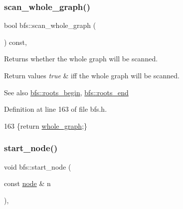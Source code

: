 \subsubsection{\texorpdfstring{scan\+\_\+whole\+\_\+graph()}{scan\_whole\_graph()}\hspace{0.1cm}{\footnotesize\ttfamily [2/2]}}
{\footnotesize\ttfamily bool bfs\+::scan\+\_\+whole\+\_\+graph (\begin{DoxyParamCaption}{ }\end{DoxyParamCaption}) const\hspace{0.3cm}{\ttfamily [inline]}, {\ttfamily [inherited]}}



Returns whether the whole graph will be scanned. 


\begin{DoxyRetVals}{Return values}
{\em true} & iff the whole graph will be scanned. \\
\hline
\end{DoxyRetVals}
\begin{DoxySeeAlso}{See also}
\mbox{\hyperlink{classbfs_a45d58d06d0dcd6427edad2ec52a6ebb9}{bfs\+::roots\+\_\+begin}}, \mbox{\hyperlink{classbfs_ac84b90f777adeb90390689db62602d73}{bfs\+::roots\+\_\+end}} 
\end{DoxySeeAlso}


Definition at line 163 of file bfs.\+h.


\begin{DoxyCode}
163 \{\textcolor{keywordflow}{return} \mbox{\hyperlink{classbfs_a6c08fbcc90d71f1cbdd03a1cdaa9dc99}{whole\_graph}};\}
\end{DoxyCode}
\mbox{\label{classbfs_a23e2981c2ee617a6e12a8833d2db6210}} 
\subsubsection{\texorpdfstring{start\+\_\+node()}{start\_node()}\hspace{0.1cm}{\footnotesize\ttfamily [1/2]}}
{\footnotesize\ttfamily void bfs\+::start\+\_\+node (\begin{DoxyParamCaption}\item[{const \mbox{\hyperlink{classnode}{node}} \&}]{n }\end{DoxyParamCaption})\hspace{0.3cm}{\ttfamily [inline]}, {\ttfamily [inherited]}}




